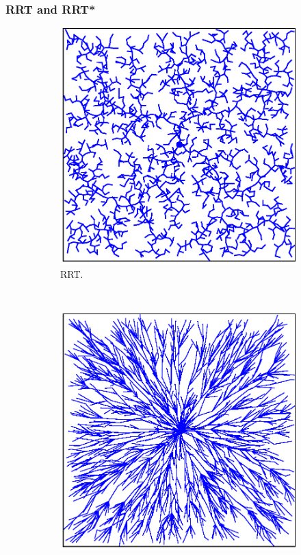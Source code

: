 \documentclass{beamer}
\begin{document}
\begin{frame}
	\frametitle{RRT and RRT*}	
	\begin{figure}[!ht]
		\centering
		\begin{subfigure}[b]{0.45\textwidth}
			\includegraphics[width=\textwidth]{figChap3/2RRTexpansion2000.eps}
			\caption{RRT.}
			\label{fig:rrt2k}
		\end{subfigure}
		~ %
		\begin{subfigure}[b]{0.45\textwidth}
			\includegraphics[width=\textwidth]{figChap3/RRTstar_expansion2000.eps}

\end{subfigure}
\end{figure}
\end{frame}
\end{document}
